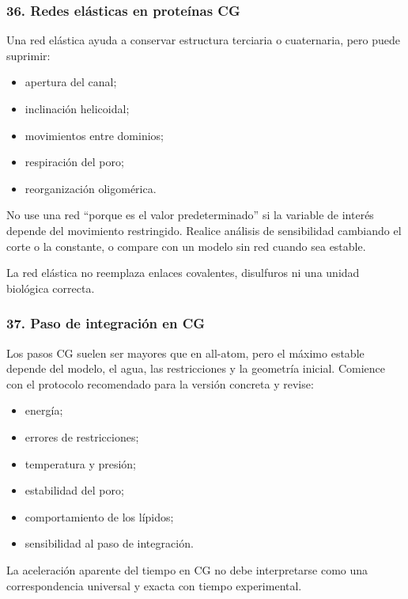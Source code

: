 \documentclass[
  spanish,
  11pt,
  a4paper]{article}
\providecommand{\tightlist}{%
  \setlength{\itemsep}{0pt}\setlength{\parskip}{0pt}}
\begin{document}
\subsubsection{36. Redes elásticas en proteínas
CG}\label{redes-eluxe1sticas-en-proteuxednas-cg}

Una red elástica ayuda a conservar estructura terciaria o cuaternaria,
pero puede suprimir:

\begin{itemize}
\tightlist
\item
  apertura del canal;
\item
  inclinación helicoidal;
\item
  movimientos entre dominios;
\item
  respiración del poro;
\item
  reorganización oligomérica.
\end{itemize}

No use una red ``porque es el valor predeterminado'' si la variable de
interés depende del movimiento restringido. Realice análisis de
sensibilidad cambiando el corte o la constante, o compare con un modelo
sin red cuando sea estable.

La red elástica no reemplaza enlaces covalentes, disulfuros ni una
unidad biológica correcta.

\subsubsection{37. Paso de integración en
CG}\label{paso-de-integraciuxf3n-en-cg}

Los pasos CG suelen ser mayores que en all-atom, pero el máximo estable
depende del modelo, el agua, las restricciones y la geometría inicial.
Comience con el protocolo recomendado para la versión concreta y revise:

\begin{itemize}
\tightlist
\item
  energía;
\item
  errores de restricciones;
\item
  temperatura y presión;
\item
  estabilidad del poro;
\item
  comportamiento de los lípidos;
\item
  sensibilidad al paso de integración.
\end{itemize}

La aceleración aparente del tiempo en CG no debe interpretarse como una
correspondencia universal y exacta con tiempo experimental.
\end{document}
